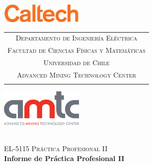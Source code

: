 
\begin{titlepage}
	
	
\includegraphics[width=4cm]{images/logo.png} 
\hspace{0cm}
\begin{tabular}{c} %

	\textsc{\color{red}Departamento de Ingeniería Eléctrica} \\
	\textsc{\color{gray51}Facultad de Ciencias Físicas y Matemáticas} \\
	\textsc{\color{gray51}Universidad de Chile} \\
	\textsc{\color{gray51}Advanced Mining Technology Center} \\
	\vspace*{1.5cm}\mbox{} %
\end{tabular}
\hspace{0cm}
\includegraphics[width=4cm]{images/amtc-logo.png} 

\vspace*{2.5 cm}
	
	
	
	\begin{center}
		~\\[0.5cm]
		{\color{gray71}\textsc{EL-5115 Práctica Profesional II}}
		\HRule~ \\[0.4cm]
		{ \Huge \textup \bfseries  Informe de Práctica Profesional II}\\[0.4cm]
		\HRule ~\\[1cm]
	\end{center}
	\begin{minipage}{.5\textwidth}
		~
	\end{minipage}
	\begin{minipage}{.5\textwidth}
		\begin{flushright}
			\vspace{5cm}%
			\begin{tabular}{l}
				

\end{tabular}
\end{flushright}
\end{minipage}
\end{titlepage}
